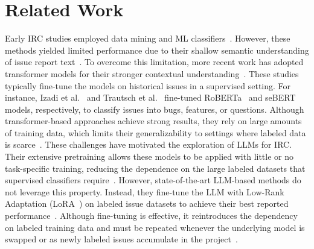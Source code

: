 
\section{Related Work}
\label{sec:02_related}

 Early IRC studies employed data mining and ML classifiers~\cite{antoniol2008bug, kallis2019ticket, fan2017road}. 
However, these methods yielded limited performance due to their shallow semantic understanding of issue report text~\cite{heo2025study}. To overcome this limitation, more recent work has adopted transformer models for their stronger contextual understanding~\cite{colavito2022issue, bharadwaj2022github, trautsch2022predicting, izadi2022catiss, izadi2022predicting}. These studies typically fine-tune the models on historical issues in a supervised setting. 
For instance, Izadi et al.~\cite{izadi2022catiss} and Trautsch et al.~\cite{trautsch2022predicting} fine-tuned RoBERTa~\cite{liu2019roberta} and seBERT~\cite{von2022validity} models, respectively, to classify issues into bugs, features, or questions.
Although transformer-based approaches achieve strong results, they rely on large amounts of training data, which limits their generalizability to settings where labeled data is scarce~\cite{heo2025study, izadi2022catiss, izadi2022predicting, colavito2022issue}. These challenges have motivated the exploration of LLMs for IRC. Their extensive pretraining allows these models to be applied with little or no task-specific training, reducing the dependence on the large labeled datasets that supervised classifiers require~\cite{aracena2025applying, aracena2024applyinglargelanguagemodels, colavito2024leveraging, colavito2025benchmarking, colavito2024large}. However, state-of-the-art LLM-based methods do not leverage this property. Instead, they fine-tune the LLM with Low-Rank Adaptation (LoRA~\cite{hu2022lora}) on labeled issue datasets to achieve their best reported performance~\cite{heo2025study, aracena2025applying, aracena2024applyinglargelanguagemodels}. Although fine-tuning is effective, it reintroduces the dependency on labeled training data and  must be repeated whenever the underlying model is swapped or as newly labeled issues accumulate in the project~\cite{fan2017road, kallis2019ticket}. 


